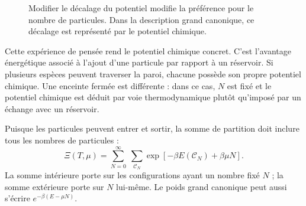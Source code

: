 \begin{figure}[ht]
\centering
{}
\caption{Modifier le décalage du potentiel modifie la préférence pour le nombre de particules. Dans la description grand canonique, ce décalage est représenté par le potentiel chimique.}
\end{figure}

Cette expérience de pensée rend le potentiel chimique concret. C’est l’avantage énergétique associé à l’ajout d’une particule par rapport à un réservoir. Si plusieurs espèces peuvent traverser la paroi, chacune possède son propre potentiel chimique. Une enceinte fermée est différente : dans ce cas, \(N\) est fixé et le potentiel chimique est déduit par voie thermodynamique plutôt qu’imposé par un échange avec un réservoir.

\begin{classroomqa}
\end{classroomqa}

Puisque les particules peuvent entrer et sortir, la somme de partition doit inclure tous les nombres de particules :
\begin{equation}
\Xi(T,\mu)
=\sum_{N=0}^{\infty}\;\sum_{\mathcal C_N}
\exp\!\left[-\beta E(\mathcal C_N)+\beta\mu N\right].
\label{eq:grand-partition}
\end{equation}
La somme intérieure porte sur les configurations ayant un nombre fixé \(N\) ; la somme extérieure porte sur \(N\) lui-même. Le poids grand canonique peut aussi s’écrire \(e^{-\beta(E-\mu N)}\).

